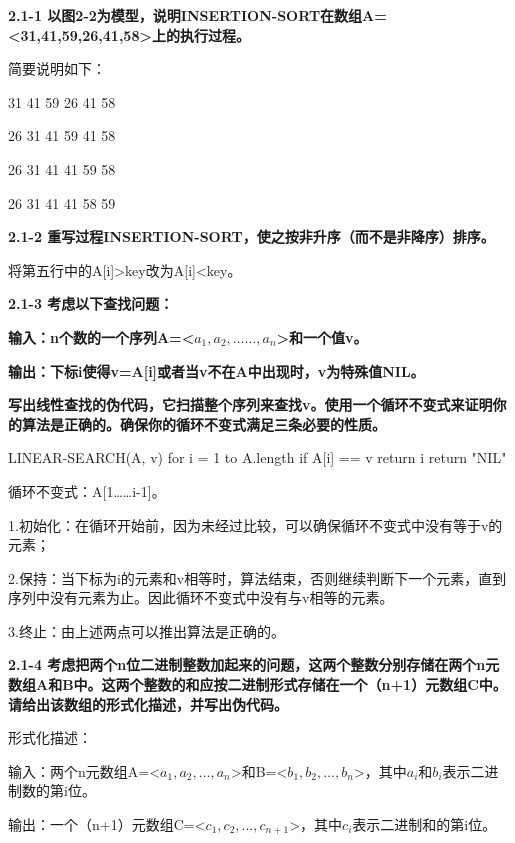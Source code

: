 \documentclass[
]{article}
\author{}
\date{}
\newenvironment{Shaded}{}{}
\newcommand{\NormalTok}[1]{#1}
\begin{document}
\textbf{2.1-1
以图2-2为模型，说明INSERTION-SORT在数组A=\textless31,41,59,26,41,58\textgreater 上的执行过程。}

简要说明如下：

31 41 59 26 41 58

26 31 41 59 41 58

26 31 41 41 59 58

26 31 41 41 58 59

\textbf{2.1-2
重写过程INSERTION-SORT，使之按非升序（而不是非降序）排序。}

将第五行中的A{[}i{]}\textgreater key改为A{[}i{]}\textless key。

\textbf{2.1-3 考虑以下查找问题：}

\textbf{输入：n个数的一个序列A=\textless{}\(a_1,a_2, ……,a_n\)\textgreater 和一个值v。}

\textbf{输出：下标i使得v=A{[}i{]}或者当v不在A中出现时，v为特殊值NIL。}

\textbf{写出线性查找的伪代码，它扫描整个序列来查找v。使用一个循环不变式来证明你的算法是正确的。确保你的循环不变式满足三条必要的性质。}

\begin{Shaded}
\begin{Highlighting}[]
\NormalTok{LINEAR{-}SEARCH(A, v)}
\NormalTok{    for i = 1 to A.length}
\NormalTok{        if A[i] == v }
\NormalTok{            return i}
\NormalTok{    return "NIL"}
\end{Highlighting}
\end{Shaded}

循环不变式：A{[}1\ldots\ldots i-1{]}。

1.初始化：在循环开始前，因为未经过比较，可以确保循环不变式中没有等于v的元素；

2.保持：当下标为i的元素和v相等时，算法结束，否则继续判断下一个元素，直到序列中没有元素为止。因此循环不变式中没有与v相等的元素。

3.终止：由上述两点可以推出算法是正确的。

\textbf{2.1-4
考虑把两个n位二进制整数加起来的问题，这两个整数分别存储在两个n元数组A和B中。这两个整数的和应按二进制形式存储在一个（n+1）元数组C中。请给出该数组的形式化描述，并写出伪代码。}

形式化描述：

输入：两个n元数组A=\textless{}\(a_1, a_2, ..., a_n\)\textgreater 和B=\textless{}\(b_1, b_2, ..., b_n\)\textgreater，其中\(a_i\)和\(b_i\)表示二进制数的第i位。

输出：一个（n+1）元数组C=\textless{}\(c_1, c_2, ..., c_{n+1}\)\textgreater，其中\(c_i\)表示二进制和的第i位。
\end{document}
